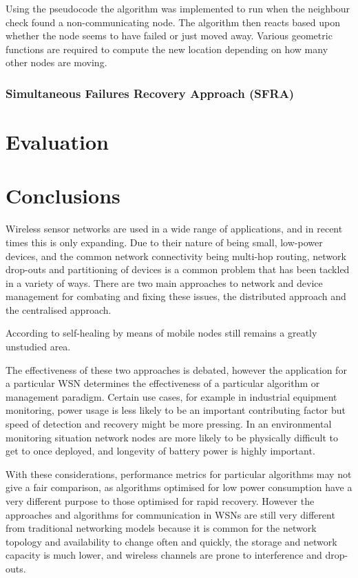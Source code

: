 \documentclass[authoryearcitations]{UoYCSproject}
\begin{document}
Using the pseudocode the algorithm was implemented to run when the neighbour check found a non-communicating node. The algorithm then reacts based upon whether the node seems to have failed or just moved away. Various geometric functions are required to compute the new location depending on how many other nodes are moving.

\subsection{Simultaneous Failures Recovery Approach (SFRA)}

\chapter{Evaluation}

\chapter{Conclusions}

Wireless sensor networks are used in a wide range of applications, and in recent times this is only expanding. Due to their nature of being small, low-power devices, and the common network connectivity being multi-hop routing, network drop-outs and partitioning of devices is a common problem that has been tackled in a variety of ways. There are two main approaches to network and device management for combating and fixing these issues, the distributed approach and the centralised approach.

According to \citet{Tong2009} self-healing by means of mobile nodes still remains a greatly unstudied area.

The effectiveness of these two approaches is debated, however the application for a particular WSN determines the effectiveness of a particular algorithm or management paradigm. Certain use cases, for example in industrial equipment monitoring, power usage is less likely to be an important contributing factor but speed of detection and recovery might be more pressing. In an environmental monitoring situation network nodes are more likely to be physically difficult to get to once deployed, and longevity of battery power is highly important.

With these considerations, performance metrics for particular algorithms may not give a fair comparison, as algorithms optimised for low power consumption have a very different purpose to those optimised for rapid recovery. However the approaches and algorithms for communication in WSNs are still very different from traditional networking models because it is common for the network topology and availability to change often and quickly, the storage and network capacity is much lower, and wireless channels are prone to interference and drop-outs.




\end{document}
